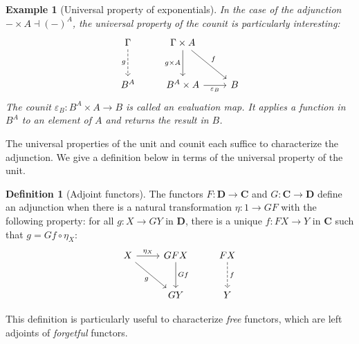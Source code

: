 \documentclass[11pt,oneside,draft]{book}
\newtheorem{example}[theorem]{Example}
\theoremstyle{definition}
\newtheorem{definition}[theorem]{Definition}
\begin{document}
\begin{example}[Universal property of exponentials] %
In the case of the adjunction $- \times A \dashv (-)^A$,
the universal property of the counit
is particularly interesting:
\[
  \begin{tikzcd}[row sep=large]
    \Gamma
      \ar[d, "g"', dashed] &
    \Gamma \times A
      \ar[d, "g \times A"']
      \ar[dr, "f"] &
    \\
    B^A &
    B^A \times A
      \ar[r, "\varepsilon_B"'] &
    B
  \end{tikzcd}
\]
The counit $\varepsilon_B : B^A \times A \rightarrow B$
is called an \emph{evaluation map}.
It applies a function in $B^A$ to an element of $A$
and returns the result in $B$.
\end{example}

The universal properties
of the unit and counit
each suffice to characterize the adjunction.
We give a definition below
in terms of the universal property of the unit.

\begin{definition}[Adjoint functors] %
The functors $F : \mathbf{D} \rightarrow \mathbf{C}$
and $G : \mathbf{C} \rightarrow \mathbf{D}$
define an adjunction
when there is a natural transformation
$\eta : 1 \rightarrow GF$
with the following property:
for all $g : X \rightarrow G Y$ in $\mathbf{D}$,
there is a unique $f : F X \rightarrow Y$ in $\mathbf{C}$
such that $g = G f \circ \eta_X$:
\[
  \begin{tikzcd}[row sep=large]
    X \ar[r, "\eta_X"] \ar[dr, "g"'] &
    G F X \ar[d, "G f"] &
    F X \ar[d, "f", dashed]
    \\ &
    G Y & Y
  \end{tikzcd}
\]
\end{definition}

This definition is particularly useful
to characterize \emph{free} functors,
which are left adjoints
of \emph{forgetful} functors.
\end{document}
